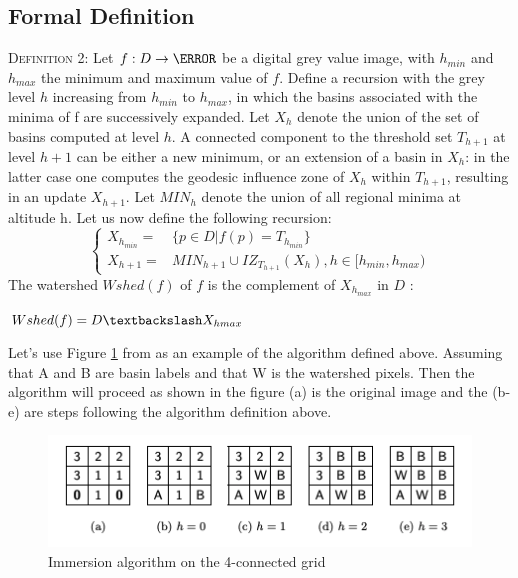 \documentclass{article}
\begin{document}
\subsection{Formal Definition}
\begin{tcolorbox}
\textsc{Definition 2:}\cite{parwshed}\newline\newline
Let $f : D \to \N$ be a digital grey value image, with $h_{min}$ and $h_{max}$ the minimum and maximum value of $f$. Define a recursion with the grey level $h$ increasing from $h_{min}$ to $h_{max}$, in which the basins associated with the minima of f are successively expanded. Let $X_h$ denote the union of the set of basins computed at level $h$. A connected component to the threshold set $T_{h + 1}$ at level $h + 1$ can be either a new minimum, or an extension of a basin in $X_h$: in the latter case one computes the geodesic influence zone of $X_h$ within $T_{h+1}$, resulting in an update $X_{h+1}$. Let $MIN_h$ denote the union of all regional minima at altitude h.\newline\newline
Let us now define the following recursion: \newline
\[
\begin{cases}
    X_{h_{min}} = & \{p \in D | f(p) = T_{h_{min}}\}\\
    X_{h+1} = & MIN_{h+1} \cup IZ_{T_{h+1}}\left(X_h\right), h \in [h_{min}, h_{max})
\end{cases}
\]
\newline\newline
The watershed $Wshed(f)$ of $f$ is the complement of $X_{h_{max}}$ in $D$ : 
\begin{center}
    $Wshed(f) = D \textbackslash X_{h{max}}$
\end{center}
\end{tcolorbox}
\vspace{2mm}
\begin{flushleft}
Let's use Figure \ref{fig:example_1} from \cite{parwshed} as an example of the algorithm defined above. Assuming that A and B are basin labels and that W is the watershed pixels. Then the algorithm will proceed as shown in the figure (a) is the original image and the (b-e) are steps following the algorithm definition above.
\end{flushleft}

\begin{figure}[H]
    \centering
    \includegraphics[width=\linewidth]{example1.png}
    \caption{Immersion algorithm on the 4-connected grid}
    \label{fig:example_1}
\end{figure}
\end{document}
